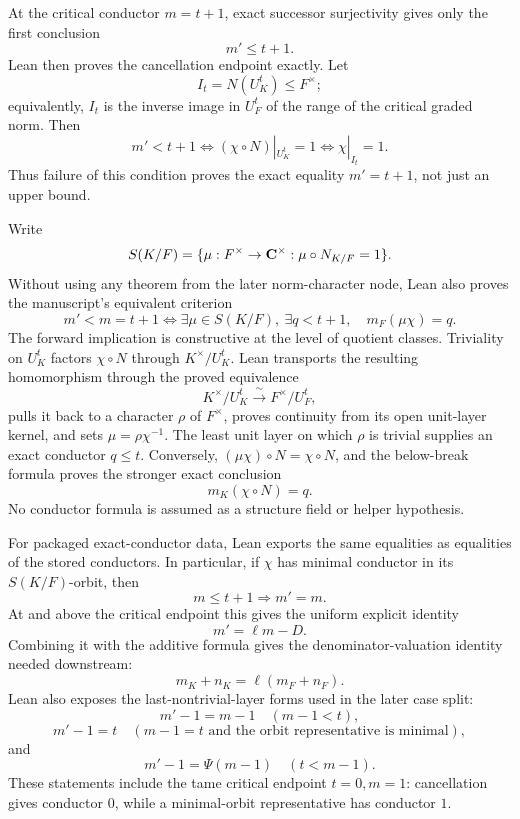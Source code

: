 \begin{theorem}
At the critical conductor $m=t+1$, exact successor surjectivity gives only
the first conclusion
\[
 m'\le t+1.
\]
Lean then proves the cancellation endpoint exactly.  Let
\[
 I_t=N(U_K^t)\le F^\times;
\]
equivalently, $I_t$ is the inverse image in $U_F^t$ of the range of the
critical graded norm.  Then
\[
 \boxed{\quad
 m'<t+1
 \Longleftrightarrow
 (\chi\circ N)|_{U_K^t}=1
 \Longleftrightarrow
 \chi|_{I_t}=1.
 \quad}
\]
Thus failure of this condition proves the exact equality $m'=t+1$, not just
an upper bound.

Write
\[
 S(K/F)=\{\mu:F^\times\to\mathbf C^\times:\mu\circ N_{K/F}=1\}.
\]
Without using any theorem from the later norm-character node, Lean also
proves the manuscript's equivalent criterion
\[
 \boxed{\quad
 m'<m=t+1
 \Longleftrightarrow
 \exists\mu\in S(K/F),\ \exists q<t+1,
 \quad m_F(\mu\chi)=q.
 \quad}
\]
The forward implication is constructive at the level of quotient classes.
Triviality on $U_K^t$ factors $\chi\circ N$ through
$K^\times/U_K^t$.  Lean transports the resulting homomorphism through the
proved equivalence
\[
 K^\times/U_K^t\xrightarrow{\ \sim\ }F^\times/U_F^t,
\]
pulls it back to a character $\rho$ of $F^\times$, proves continuity from
its open unit-layer kernel, and sets $\mu=\rho\chi^{-1}$.  The least unit
layer on which $\rho$ is trivial supplies an exact conductor $q\le t$.
Conversely, $(\mu\chi)\circ N=\chi\circ N$, and the below-break formula
proves the stronger exact conclusion
\[
 m_K(\chi\circ N)=q.
\]
No conductor formula is assumed as a structure field or helper hypothesis.

For packaged exact-conductor data, Lean exports the same equalities as
equalities of the stored conductors.  In particular, if $\chi$ has minimal
conductor in its $S(K/F)$-orbit, then
\[
 m\le t+1\Longrightarrow m'=m.
\]
At and above the critical endpoint this gives the uniform explicit identity
\[
 m'=\ell m-D.
\]
Combining it with the additive formula gives the denominator-valuation
identity needed downstream:
\[
 \boxed{\quad
 m_K+n_K=\ell(m_F+n_F).
 \quad}
\]
Lean also exposes the last-nontrivial-layer forms used in the later case
split:
\[
 m'-1=m-1\quad(m-1<t),
\]
\[
 m'-1=t\quad(m-1=t\text{ and the orbit representative is minimal}),
\]
and
\[
 m'-1=\Psi(m-1)\quad(t<m-1).
\]
These statements include the tame critical endpoint $t=0,m=1$: cancellation
gives conductor $0$, while a minimal-orbit representative has conductor $1$.


\end{theorem}
